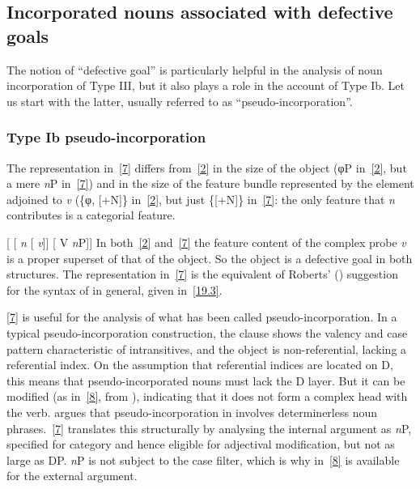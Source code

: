 \documentclass[output=paper]{langsci/langscibook}
\begin{document}
\begin{refcontext}
\subsection{Incorporated nouns associated with defective goals}
\label{2.1}

The notion of \enquote{defective goal} is particularly helpful in the analysis of
noun incorporation of Type III, but it also plays a role in the account of Type
Ib. Let us start with the latter, usually referred to as
\enquote{pseudo-incorporation}.

\subsubsection{Type Ib pseudo-incorporation}

The representation in~\eqref{7} differs from~\eqref{2} in the size of the
object (φ{}P in~\eqref{2}, but a mere \emph{n}P in~\eqref{7}) and in the size
of the feature bundle represented by the element adjoined to
\emph{v} (\{φ{}, [+N]\} in~\eqref{2}, but just \{[+N]\} in~\eqref{7}: the only
feature that \emph{n} contributes is a categorial feature.

\ea {}[ [ \emph{n}\tss{\{[+N]\}} [ \hspace{-1ex}\emph{v}\tss{\{[+V], \Acc{}, \ldots{}\}}]] [ V \emph{n}P\tss{\{[+N]\}}]] \label{7}
\z
In both~\eqref{2} and~\eqref{7} the feature content of the complex probe \emph{v}
is a proper superset of that of the object. So the object is a defective goal
in both structures. The representation in~\eqref{7} is the equivalent of Roberts'
(\citeyear{Roberts2010}) suggestion for the syntax of  in
general, given in~\eqref{19.3}.

\eqref{7} is useful for the analysis of what has been called
pseudo-incorporation. In a typical pseudo-incorporation construction, the
clause shows the valency and case pattern characteristic of intransitives, and
the object is non-referential, lacking a referential index. On the assumption
that referential indices are located on D, this means that pseudo-incorporated
nouns must lack the D layer. But it can be modified (as in~\eqref{8}, from
), indicating that it does not form a complex head with the verb.
\citet{massam01} argues that pseudo-incorporation in  involves
determinerless noun phrases.~\eqref{7} translates this structurally by analysing
the internal argument as \emph{n}P, specified for category and hence eligible
for adjectival modification, but not as large as DP. \emph{n}P is not subject
to the case filter, which is why in~\eqref{8}  is available for
the external argument.


\end{refcontext}
\end{document}
